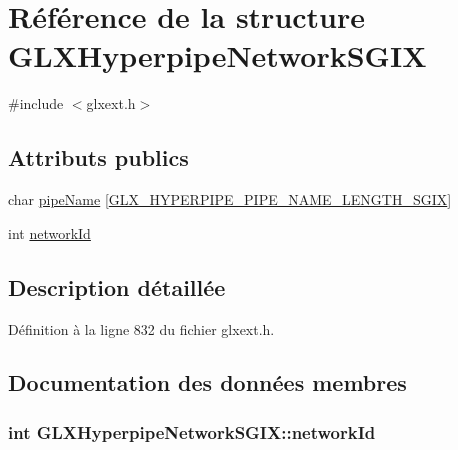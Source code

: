 \hypertarget{struct_g_l_x_hyperpipe_network_s_g_i_x}{\section{Référence de la structure G\-L\-X\-Hyperpipe\-Network\-S\-G\-I\-X}
\label{struct_g_l_x_hyperpipe_network_s_g_i_x}
}


{\ttfamily \#include $<$glxext.\-h$>$}

\subsection*{Attributs publics}
\begin{DoxyCompactItemize}
\item 
char \hyperlink{struct_g_l_x_hyperpipe_network_s_g_i_x_a6338b9717fa895aec16b932f2ef693ed}{pipe\-Name} \mbox{[}\hyperlink{glxext_8h_ae1c8261c0861010d8003a31d07e26005}{G\-L\-X\-\_\-\-H\-Y\-P\-E\-R\-P\-I\-P\-E\-\_\-\-P\-I\-P\-E\-\_\-\-N\-A\-M\-E\-\_\-\-L\-E\-N\-G\-T\-H\-\_\-\-S\-G\-I\-X}\mbox{]}
\item 
int \hyperlink{struct_g_l_x_hyperpipe_network_s_g_i_x_a81393053988b32fadb0b21615024add1}{network\-Id}
\end{DoxyCompactItemize}


\subsection{Description détaillée}


Définition à la ligne 832 du fichier glxext.\-h.



\subsection{Documentation des données membres}
\hypertarget{struct_g_l_x_hyperpipe_network_s_g_i_x_a81393053988b32fadb0b21615024add1}{
\subsubsection[{network\-Id}]{\setlength{\rightskip}{0pt plus 5cm}int G\-L\-X\-Hyperpipe\-Network\-S\-G\-I\-X\-::network\-Id}}\label{struct_g_l_x_hyperpipe_network_s_g_i_x_a81393053988b32fadb0b21615024add1}


